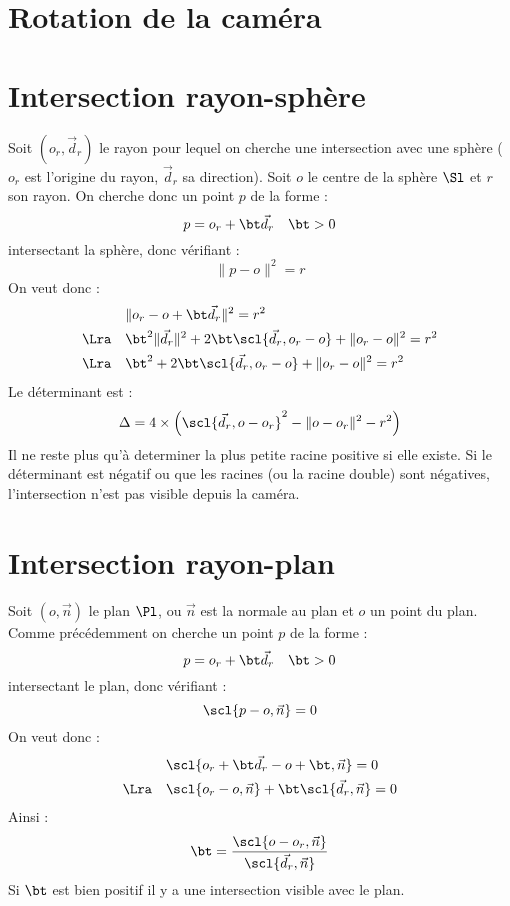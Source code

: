 \newpage\section{Rotation de la caméra}


\newpage\section{Intersection rayon-sphère}
\ni Soit $(o_r, \vec{d}_r)$ le rayon pour lequel on cherche une intersection
avec une sphère ($o_r$ est l'origine du rayon, $\vec{d}_r$ sa direction). Soit $o$ le
centre de la sphère $\Sl$ et $r$ son rayon. On cherche donc un point $p$ de la forme
:
$$p = o_r + \bt \vec{d}_r\quad \bt>0$$
\ni intersectant la sphère, donc vérifiant :
$$\|p - o\|^2 = r$$
\ni On veut donc :
\begin{align*}
	&\|o_r - o + \bt \vec{d}_r\|^2=r^2\\
	\Lra\quad&\bt^2\|\vec{d}_r\|^2 + 2\bt\scl{\vec{d}_r, o_r - o} 
	+\|o_r - o\|^2 =r^2\\
	\Lra\quad&\bt^2 + 2\bt\scl{\vec{d}_r, o_r - o} +\|o_r - o\|^2 =r^2
\end{align*}
\ni Le déterminant est :
$$\Delta = 4\times\left(\scl{\vec{d}_r, o - o_r}^2 - \|o - o_r\|^2 - 
r^2\right)$$
\ni Il ne reste plus qu'à determiner la plus petite racine positive si elle
existe. Si le déterminant est négatif ou que les racines (ou la racine double)
sont négatives, l'intersection n'est pas visible depuis la caméra.

\section{Intersection rayon-plan}
\ni Soit $(o,\vec{n})$ le plan $\Pl$, ou $\vec{n}$ est la normale au plan et $o$
un point du plan. Comme précédemment on cherche un point $p$ de la forme :
$$p = o_r + \bt \vec{d}_r\quad \bt>0$$
\ni intersectant le plan, donc vérifiant :
$$\scl{p - o, \vec{n}} = 0$$
\ni On veut donc :
\begin{align*}
	&\scl{o_r + \bt \vec{d}_r - o + \bt, \vec{n}}=0\\
	\Lra\quad&\scl{o_r - o, \vec{n}} + \bt \scl{\vec{d}_r,\vec{n}}=0\\
\end{align*}
Ainsi :
$$\bt = \frac{\scl{o - o_r, \vec{n}}}{\scl{\vec{d}_r,\vec{n}}}$$
\ni Si $\bt$ est bien positif il y a une intersection visible avec le plan.

